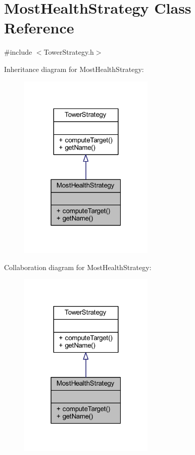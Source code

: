 \hypertarget{class_most_health_strategy}{\section{Most\+Health\+Strategy Class Reference}
\label{class_most_health_strategy}
}


{\ttfamily \#include $<$Tower\+Strategy.\+h$>$}



Inheritance diagram for Most\+Health\+Strategy\+:\nopagebreak
\begin{figure}[H]
\begin{center}
\leavevmode
\includegraphics[width=183pt]{class_most_health_strategy__inherit__graph}
\end{center}
\end{figure}


Collaboration diagram for Most\+Health\+Strategy\+:\nopagebreak
\begin{figure}[H]
\begin{center}
\leavevmode
\includegraphics[width=183pt]{class_most_health_strategy__coll__graph}
\end{center}
\end{figure}

